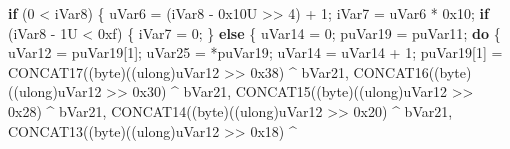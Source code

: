 \documentclass[
]{article}
\newenvironment{Shaded}{}{}
\newcommand{\BaseNTok}[1]{\textcolor[rgb]{0.25,0.63,0.44}{#1}}
\newcommand{\BuiltInTok}[1]{\textcolor[rgb]{0.00,0.50,0.00}{#1}}
\newcommand{\ControlFlowTok}[1]{\textcolor[rgb]{0.00,0.44,0.13}{\textbf{#1}}}
\newcommand{\DecValTok}[1]{\textcolor[rgb]{0.25,0.63,0.44}{#1}}
\newcommand{\ExtensionTok}[1]{#1}
\newcommand{\NormalTok}[1]{#1}
\newcommand{\OperatorTok}[1]{\textcolor[rgb]{0.40,0.40,0.40}{#1}}
\begin{document}
\begin{Shaded}
\begin{Highlighting}[]
  \ControlFlowTok{if} \OperatorTok{(}\DecValTok{0} \OperatorTok{\textless{}}\NormalTok{ iVar8}\OperatorTok{)} \OperatorTok{\{}
\NormalTok{    uVar6 }\OperatorTok{=} \OperatorTok{(}\NormalTok{iVar8 }\OperatorTok{{-}} \BaseNTok{0x10}\BuiltInTok{U} \OperatorTok{\textgreater{}\textgreater{}} \DecValTok{4}\OperatorTok{)} \OperatorTok{+} \DecValTok{1}\OperatorTok{;}
\NormalTok{    iVar7 }\OperatorTok{=}\NormalTok{ uVar6 }\OperatorTok{*} \BaseNTok{0x10}\OperatorTok{;}
    \ControlFlowTok{if} \OperatorTok{(}\NormalTok{iVar8 }\OperatorTok{{-}} \DecValTok{1}\BuiltInTok{U} \OperatorTok{\textless{}} \BaseNTok{0xf}\OperatorTok{)} \OperatorTok{\{}
\NormalTok{      iVar7 }\OperatorTok{=} \DecValTok{0}\OperatorTok{;}
    \OperatorTok{\}}
    \ControlFlowTok{else} \OperatorTok{\{}
\NormalTok{      uVar14 }\OperatorTok{=} \DecValTok{0}\OperatorTok{;}
\NormalTok{      puVar19 }\OperatorTok{=}\NormalTok{ puVar11}\OperatorTok{;}
      \ControlFlowTok{do} \OperatorTok{\{}
\NormalTok{        uVar12 }\OperatorTok{=}\NormalTok{ puVar19}\OperatorTok{[}\DecValTok{1}\OperatorTok{];}
\NormalTok{        uVar25 }\OperatorTok{=} \OperatorTok{*}\NormalTok{puVar19}\OperatorTok{;}
\NormalTok{        uVar14 }\OperatorTok{=}\NormalTok{ uVar14 }\OperatorTok{+} \DecValTok{1}\OperatorTok{;}
\NormalTok{        puVar19}\OperatorTok{[}\DecValTok{1}\OperatorTok{]} \OperatorTok{=}\NormalTok{ CONCAT17}\OperatorTok{((}\NormalTok{byte}\OperatorTok{)((}\ExtensionTok{ulong}\OperatorTok{)}\NormalTok{uVar12 }\OperatorTok{\textgreater{}\textgreater{}} \BaseNTok{0x38}\OperatorTok{)} \OperatorTok{\^{}}\NormalTok{ bVar21}\OperatorTok{,}
\NormalTok{                              CONCAT16}\OperatorTok{((}\NormalTok{byte}\OperatorTok{)((}\ExtensionTok{ulong}\OperatorTok{)}\NormalTok{uVar12 }\OperatorTok{\textgreater{}\textgreater{}} \BaseNTok{0x30}\OperatorTok{)} \OperatorTok{\^{}}\NormalTok{ bVar21}\OperatorTok{,}
\NormalTok{                                       CONCAT15}\OperatorTok{((}\NormalTok{byte}\OperatorTok{)((}\ExtensionTok{ulong}\OperatorTok{)}\NormalTok{uVar12 }\OperatorTok{\textgreater{}\textgreater{}} \BaseNTok{0x28}\OperatorTok{)} \OperatorTok{\^{}}\NormalTok{ bVar21}\OperatorTok{,}
\NormalTok{                                                CONCAT14}\OperatorTok{((}\NormalTok{byte}\OperatorTok{)((}\ExtensionTok{ulong}\OperatorTok{)}\NormalTok{uVar12 }\OperatorTok{\textgreater{}\textgreater{}} \BaseNTok{0x20}\OperatorTok{)} \OperatorTok{\^{}}\NormalTok{ bVar21}\OperatorTok{,}
\NormalTok{                                                         CONCAT13}\OperatorTok{((}\NormalTok{byte}\OperatorTok{)((}\ExtensionTok{ulong}\OperatorTok{)}\NormalTok{uVar12 }\OperatorTok{\textgreater{}\textgreater{}} \BaseNTok{0x18}\OperatorTok{)} \OperatorTok{\^{}}

\end{Highlighting}
\end{Shaded}
\end{document}
